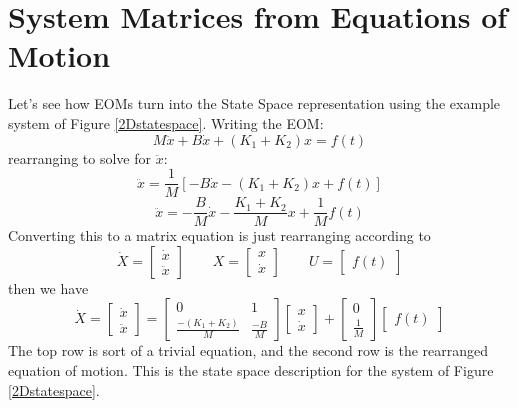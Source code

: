 \section{System Matrices from Equations of Motion}\label{SecSystemMatricesFromEOMs}
Let's see how EOMs turn into the State Space representation using the example system of Figure \ref{2Dstatespace}.  Writing the EOM:
\[
M\ddot{x}+B\dot{x}+(K_1+K_2)x = f(t)
\]
rearranging to solve for $\ddot{x}$:
\[
\ddot{x} = \frac{1}{M}\left[ -B\dot{x}-(K_1+K_2)x+f(t)\right ]
\]
\[
\ddot{x} = -\frac{B}{M}\dot{x} - \frac{K_1+K_2}{M}x + \frac{1}{M}f(t)
\]
Converting this to a matrix equation is just rearranging according to
\[
       \dot{X} = \begin{bmatrix}\dot{x} \\ \ddot{x} \end{bmatrix}
\qquad      X  = \begin{bmatrix} x \\ \dot{x} \end{bmatrix}
\qquad U       = \begin{bmatrix}f(t)\end{bmatrix}
\]
then we have
\[
\dot{X} =
\begin{bmatrix}\dot{x} \\ \ddot{x} \end{bmatrix} =
\begin{bmatrix}0&1\\\frac{-(K_1+K_2)}{M}&\frac{-B}{M}\end{bmatrix}
\begin{bmatrix}x\\ \dot{x}\end{bmatrix}+
\begin{bmatrix}0\\ \frac{1}{M}\end{bmatrix}
\begin{bmatrix}f(t)\end{bmatrix}
\]
The top row is sort of a trivial equation, and the second row is the rearranged equation of motion.
This is the state space description for the system of Figure \ref{2Dstatespace}.



